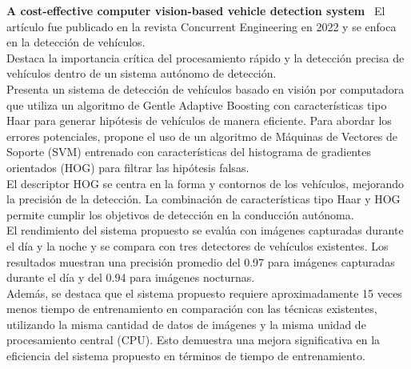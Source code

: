 \textbf{A cost-effective computer vision-based vehicle detection system}~\cite{alam2022cost}
El artículo fue publicado en la revista Concurrent Engineering en 2022 y se enfoca en la detección de vehículos.
\\Destaca la importancia crítica del procesamiento rápido y la detección precisa de vehículos dentro de un sistema autónomo de detección.
\\Presenta un sistema de detección de vehículos basado en visión por computadora que utiliza un algoritmo de Gentle Adaptive Boosting
con características tipo Haar para generar hipótesis de vehículos de manera eficiente.
Para abordar los errores potenciales, propone el uso de un algoritmo de Máquinas de Vectores de Soporte (SVM) entrenado con características
del histograma de gradientes orientados (HOG) para filtrar las hipótesis falsas.
\\El descriptor HOG se centra en la forma y contornos de los vehículos, mejorando la precisión de la detección.
La combinación de características tipo Haar y HOG permite cumplir los objetivos de detección en la conducción autónoma.
\\El rendimiento del sistema propuesto se evalúa con imágenes capturadas durante el día y la noche y se compara con tres detectores
de vehículos existentes. Los resultados muestran una precisión promedio del 0.97 para imágenes capturadas durante el día
y del 0.94 para imágenes nocturnas.                                                                                               \\Además, se destaca que el sistema propuesto requiere aproximadamente 15 veces menos tiempo
de entrenamiento en comparación con las técnicas existentes, utilizando la misma cantidad de datos de imágenes y la misma unidad
de procesamiento central (CPU). Esto demuestra una mejora significativa en la eficiencia del sistema propuesto en términos de tiempo de entrenamiento.
